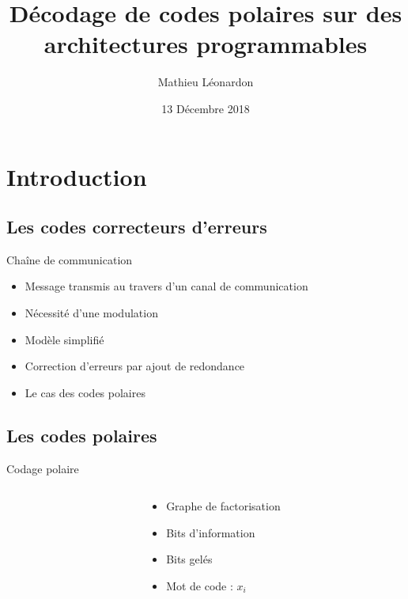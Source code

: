 \documentclass[t,compress,mathserif,12pt,xcolor=dvipsnames]{beamer}
\title{\textbf{Décodage de codes polaires sur des architectures programmables}}
\author[Mathieu Léonardon\hspace{7.51cm}{mathieu.leonardon@ims-bordeaux.fr}]    {Mathieu Léonardon}
\date{13 Décembre 2018}
\begin{document}
\begin{frame}[c]
\titlepage
\end{frame}

\begin{frame}[c]
	\tableofcontents[
	subsectionstyle=hide,
	]
\end{frame}




\section[Introduction]{Introduction}
\subsection{Les codes correcteurs d'erreurs}

\begin{frame}[c]{Chaîne de communication}
	\begin{center}
	\end{center}

	\begin{itemize}
		\item<1-> Message transmis au travers d'un canal de communication
		\item<2-> Nécessité d'une modulation
		\item<3-> Modèle simplifié
		\item<4-> Correction d'erreurs par ajout de redondance
		\item<5-> Le cas des codes polaires
	\end{itemize}
\end{frame}

\subsection{Les codes polaires}

\begin{frame}[c]{Codage polaire}
	\begin{columns}[T] %
		\begin{column}{.65\textwidth}
		\end{column}
		\begin{column}{.35\textwidth}
		\begin{itemize}
			\item<1-> Graphe de factorisation
			\item<2-> Bits d'information
			\item<3-> Bits gelés \footnotemark
			\item<5-> Mot de code : $x_i$
		\end{itemize}
		\end{column}
	\end{columns}

\end{frame}
\end{document}
